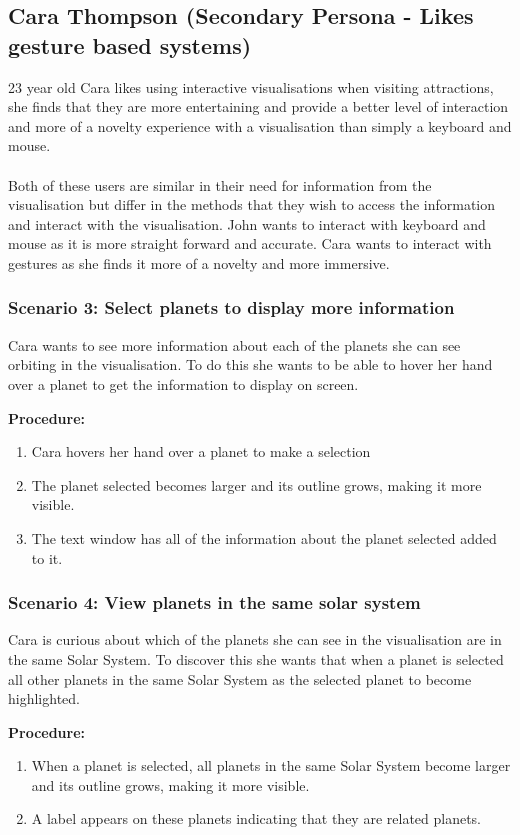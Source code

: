 \subsection{Cara Thompson (Secondary Persona - Likes gesture based systems)}
23 year old Cara likes using interactive visualisations when visiting
attractions, she finds that they are more entertaining and provide a better
level of interaction and more of a novelty experience with a visualisation than
simply a keyboard and mouse. 
\\\\
Both of these users are similar in their need for information from the
visualisation but differ in the methods that they wish to access the information
and interact with the visualisation. John wants to interact with keyboard and
mouse as it is more straight forward and accurate. Cara wants to interact with
gestures as she finds it more of a novelty and more immersive.

 \subsubsection{Scenario 3: Select planets to display more information}
 Cara wants to see more information about each of the planets she can see
orbiting in the visualisation. To do this she wants to be able to hover her hand
over a planet to get the information to display on screen.
 
  {\bf  Procedure:}
   \begin{enumerate}
 \item Cara hovers her hand over a planet to make a selection
 \item The planet selected becomes larger and its outline grows, making it more
visible.
\item The text window has all of the information about the planet selected added
to it.
 \end{enumerate}
 
  \subsubsection{Scenario 4: View planets in the same solar system}
Cara is curious about which of the planets she can see in the
visualisation are in the same Solar System. To discover this she wants that when
a planet is selected all other planets in the same Solar System as the selected
planet to become highlighted.
 
  {\bf  Procedure:}
   \begin{enumerate}
 \item When a planet is selected, all planets in the same Solar System become
larger and its outline grows, making it more visible.
 \item A label appears on these planets indicating that they are related
planets.
 \end{enumerate}

